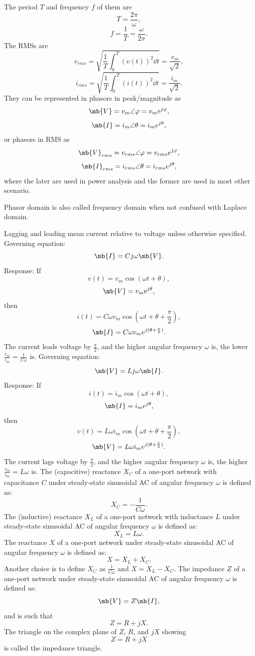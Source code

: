 \documentclass[a4paper,12pt]{article}
\begin{document}
The period $T$ and frequency $f$ of them are
\[T=\frac{2\pi}{\omega},\]
\[f=\frac{1}{T}=\frac{\omega}{2\pi}.\]
The RMSs are
\[v_{rms}=\sqrt{\frac{1}{T}\int_0^T(v(t))^2\dd{t}}=\frac{v_m}{\sqrt{2}},\]
\[i_{rms}=\sqrt{\frac{1}{T}\int_0^T(i(t))^2\dd{t}}=\frac{i_m}{\sqrt{2}}.\]
They can be represented in phasors in peak/magnitude as
\[\mb{V}=v_m\angle\varphi=v_me^{j\varphi},\]
\[\mb{I}=i_m\angle\theta=i_me^{j\theta},\]
or phasors in RMS as
\[\mb{V}_{rms}=v_{rms}\angle\varphi=v_{rms}e^{j\varphi},\]
\[\mb{I}_{rms}=i_{rms}\angle\theta=i_{rms}e^{j\theta},\]
where the later are used in power analysis and the former are used in most other scenario.

Phasor domain is also called frequency domain when not confused with Laplace domain.

Lagging and leading mean current relative to voltage unless otherwise specified.
Governing equation:
\[\mb{I}=Cj\omega\mb{V}.\]
Response: If
\[v(t)=v_m\cos(\omega t+\theta),\]
\[\mb{V}=v_me^{j\theta},\]
then
\[i(t)=C\omega v_m\cos(\omega t+\theta+\frac{\pi}{2}),\]
\[\mb{I}=C\omega v_me^{j(\theta+\frac{\pi}{2})}.\]
The current leads voltage by $\frac{\pi}{2}$, and the higher angular frequency $\omega$ is, the lower $\frac{v_m}{i_m}=\frac{1}{C\omega}$ is.
Governing equation:
\[\mb{V}=Lj\omega\mb{I}.\]
Response: If
\[i(t)=i_m\cos(\omega t+\theta),\]
\[\mb{I}=i_me^{j\theta},\]
then
\[v(t)=L\omega i_m\cos(\omega t+\theta+\frac{\pi}{2}),\]
\[\mb{V}=L\omega i_me^{j(\theta+\frac{\pi}{2})}.\]
The current lags voltage by $\frac{\pi}{2}$, and the higher angular frequency $\omega$ is, the higher $\frac{v_m}{i_m}=L\omega$ is.
The (capacitive) reactance $X_C$ of a one-port network with capacitance $C$ under steady-state sinusoidal AC of angular frequency $\omega$ is defined as:
\[X_C=-\frac{1}{C\omega}.\]
The (inductive) reactance $X_L$ of a one-port network with inductance $L$ under steady-state sinusoidal AC of angular frequency $\omega$ is defined as:
\[X_L=L\omega.\]
The reactance $X$ of a one-port network under steady-state sinusoidal AC of angular frequency $\omega$ is defined as:
\[X=X_L+X_C.\]
Another choice is to define $X_C$ as $\frac{1}{C\omega}$ and $X=X_L-X_C$.
The impedance $Z$ of a one-port network under steady-state sinusoidal AC of angular frequency $\omega$ is defined as:
\[\mb{V}=Z\mb{I},\]
and is such that
\[Z=R+jX.\]
The triangle on the complex plane of $Z$, $R$, and $jX$ showing
\[Z=R+jX\]
is called the impedance triangle.
\end{document}
